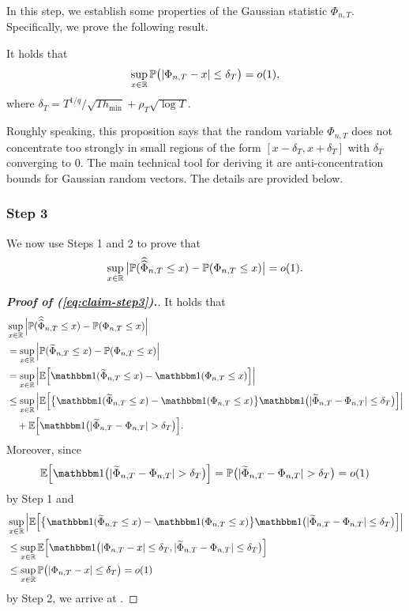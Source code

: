 \documentclass[12pt]{article}
\makeatletter
\renewcommand{\eqref}[1]{\tagform@{\ref{#1}}}
\makeatother
\begin{document}
In this step, we establish some properties of the Gaussian statistic $\Phi_{n,T}$. Specifically, we prove the following result.  
\begin{propA}\label{propA:anticon}
It holds that 
\begin{equation*}
\sup_{x \in \mathbb{R}} \mathbb{P} \big( | \Phi_{n,T} - x | \le \delta_T \big) = o(1),
\end{equation*}
where $\delta_T = T^{1/q} / \sqrt{T h_{\min}} + \rho_T \sqrt{\log T}$.
\end{propA}
Roughly speaking, this proposition says that the random variable $\Phi_{n,T}$ does not concentrate too strongly in small regions of the form $[x-\delta_T,x+\delta_T]$ with $\delta_T$ converging to $0$. The main technical tool for deriving it are anti-concentration bounds for Gaussian random vectors. The details are provided below. 


\subsubsection*{Step 3}


We now use Steps 1 and 2 to prove that 
\begin{equation}\label{eq:claim-step3}
\sup_{x \in \mathbb{R}} \big| \mathbb{P}(\widehat{\widehat{\Phi}}_{n, T} \le x) - \mathbb{P}(\Phi_{n,T} \le x) \big| = o(1). 
\end{equation}
\begin{proof}[\textnormal{\textbf{Proof of (\ref{eq:claim-step3}).}}]
It holds that
\begin{align*}
 & \sup_{x \in \reals} \Big| \pr(\doublehattwo{\Phi}_{n, T} \le x) - \pr(\Phi_{n,T} \le x) \Big| \\
 & = \sup_{x \in \reals} \Big| \pr(\widetilde{\Phi}_{n, T} \le x) - \pr(\Phi_{n,T} \le x) \Big| \\
 & = \sup_{x \in \reals} \Big| \ex \Big[ \ind(\widetilde{\Phi}_{n, T} \le x) - \ind (\Phi_{n,T} \le x) \Big] \Big| \\
 & \le \sup_{x \in \reals} \Big| \ex \Big[ \big\{ \ind(\widetilde{\Phi}_{n, T} \le x) - \ind (\Phi_{n,T} \le x) \big\} \ind \big( |\widetilde{\Phi}_{n, T} - \Phi_{n,T}| \le \delta_T \big) \Big] \Big| \\
 & \quad + \ex \Big[ \ind \big( |\widetilde{\Phi}_{n, T} - \Phi_{n,T}| > \delta_T \big) \Big].
\end{align*} 
Moreover, since  
\[ \ex \Big[ \ind \big( |\widetilde{\Phi}_{n, T} - \Phi_{n,T}| > \delta_T \big) \Big] = \pr  \big( |\widetilde{\Phi}_{n, T} - \Phi_{n,T}| > \delta_T \big) = o(1) \]
by Step 1 and 
\begin{align*}
 & \sup_{x \in \reals} \Big| \ex \Big[ \big\{ \ind(\widetilde{\Phi}_{n, T} \le x) - \ind (\Phi_{n,T} \le x) \big\} \ind \big( |\widetilde{\Phi}_{n, T} - \Phi_{n,T}| \le \delta_T \big) \Big] \Big| \\
 & \le \sup_{x \in \reals} \ex \Big[ \ind \big( |\Phi_{n, T} - x| \le \delta_T, |\widetilde{\Phi}_{n, T} - \Phi_{n,T}| \le \delta_T \big) \Big] \\
 & \le \sup_{x \in \reals} \pr \big( |\Phi_{n, T} - x| \le \delta_T \big) = o(1)
\end{align*}
by Step 2, we arrive at \eqref{eq:claim-step3}.
\end{proof}
\end{document}
